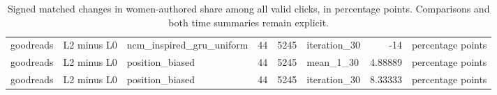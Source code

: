 \begin{table}[htbp!]
\begin{tabular}{lllrrlrl}
goodreads & L2 minus L0 & ncm\_inspired\_gru\_uniform & 44 & 5245 & iteration\_30 & -14 & percentage points \\
goodreads & L2 minus L0 & position\_biased & 44 & 5245 & mean\_1\_30 & 4.88889 & percentage points \\
goodreads & L2 minus L0 & position\_biased & 44 & 5245 & iteration\_30 & 8.33333 & percentage points \\
\hline
\end{tabular}
\caption{Signed matched changes in women-authored share among all valid clicks, in percentage points. Comparisons and both time summaries remain explicit.}
\label{chap:results:tab:rq7_matched_women_authored_click_effects}
\end{table}
